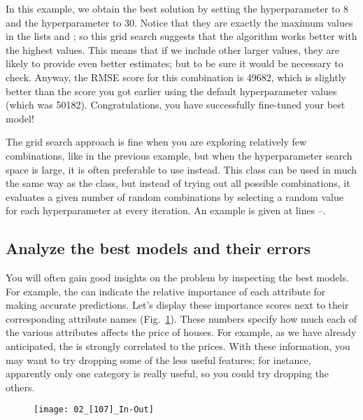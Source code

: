 In this example, we obtain the best solution by setting the  hyperparameter to 8 and the  hyperparameter to 30. Notice that they are exactly the maximum values in the lists  and ; so this grid search suggests that the algorithm works better with the highest values. This means that if we include other larger values, they are likely to provide even better estimates; but to be sure it would be necessary to check. Anyway, the RMSE score for this combination is \num{49682}, which is slightly better than the score you got earlier using the default hyperparameter values (which was \num{50182}). Congratulations, you have successfully fine-tuned your best model!

The grid search approach is fine when you are exploring relatively few combinations, like in the previous example, but when the hyperparameter search space is large, it is often preferable to use  instead. This class can be used in much the same way as the  class, but instead of trying out all possible combinations, it evaluates a given number of random combinations by selecting a random value for each hyperparameter at every iteration. An example is given at lines --.
\subsection{Analyze the best models and their errors}
You will often gain good insights on the problem by inspecting the best models. For example, the  can indicate the relative importance of each attribute for making accurate predictions. Let's display these importance scores next to their corresponding attribute names (Fig.~\ref{02_[107]_In-Out}). These numbers specify how much each of the various attributes affects the price of houses. For example, as we have already anticipated, the  is strongly correlated to the prices. With these information, you may want to try dropping some of the less useful features; for instance, apparently only one  category is really useful, so you could try dropping the others.
\begin{figure}[h!t]
\centering
\texttt{[image: 02\_[107]\_In-Out]}
\caption{}\label{02_[107]_In-Out}
\end{figure}
